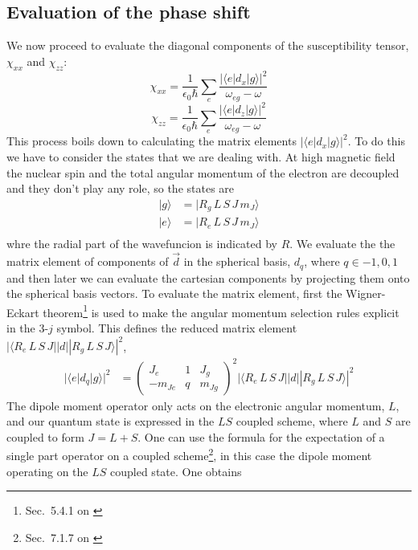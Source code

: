 \documentclass{article}[12pt]
\begin{document}
\subsection{Evaluation of the phase shift}

We now proceed to evaluate the diagonal components of the susceptibility tensor, $\chi_{xx}$ and $\chi_{zz}$:
\[ \chi_{xx} = \frac{1}{\epsilon_{0}\hbar } \sum_{e}   \frac{ |\langle e | d_{x} | g \rangle|^{2} }{\omega_{eg} -\omega   } \]
\[ \chi_{zz} = \frac{1}{\epsilon_{0}\hbar } \sum_{e}   \frac{ |\langle e | d_{z} | g \rangle|^{2} }{\omega_{eg} -\omega   } \]
This process boils down to calculating the matrix elements $|\langle e | d_{x} | g \rangle|^{2}$. To do this we have to consider the states that we are dealing with. At high magnetic field the nuclear spin and the total angular momentum of the electron are decoupled and they don't play any role, so the states are 
\begin{align}
|g\rangle & = | R_{g}\, L\,S\,J\,m_{J} \rangle \\
|e\rangle & = | R_{e}\, L\,S\,J\,m_{J} \rangle \\
\end{align}
whre the radial part of the wavefuncion is indicated by $R$.  We evaluate the the matrix element of components of $\vec{d}$ in the spherical basis, $d_{q}$, where $q\in{-1,0,1}$ and then later we can evaluate the cartesian components by projecting them onto the spherical basis vectors.  To evaluate the matrix element, first the Wigner-Eckart theorem\footnote{Sec.~5.4.1 on \cite{edmonds1996angular}} is used to make the angular momentum selection rules explicit in the 3-$j$ symbol.  This defines the reduced matrix element $|\langle R_{e}\, L\,S\,J || d || R_{g}\, L\,S\,J \rangle|^{2}$, 
\begin{align}
|\langle e | d_{q} | g \rangle|^{2} & = \begin{pmatrix} J_{e} & 1 & J_{g} \\ -m_{Je} & q & m_{Jg} \end{pmatrix}^{2}
|\langle R_{e}\, L\,S\,J || d || R_{g}\, L\,S\,J \rangle|^{2}
\end{align}
The dipole moment operator only acts on the electronic angular momentum, $L$, and our quantum state is expressed in the $LS$ coupled scheme, where $L$ and $S$ are coupled to form $J=L+S$.  One can use the formula for the expectation of a single part operator on a coupled scheme\footnote{Sec.~7.1.7 on \cite{edmonds1996angular}}, in this case the dipole moment operating on the $LS$ coupled state. One obtains
\end{document}
